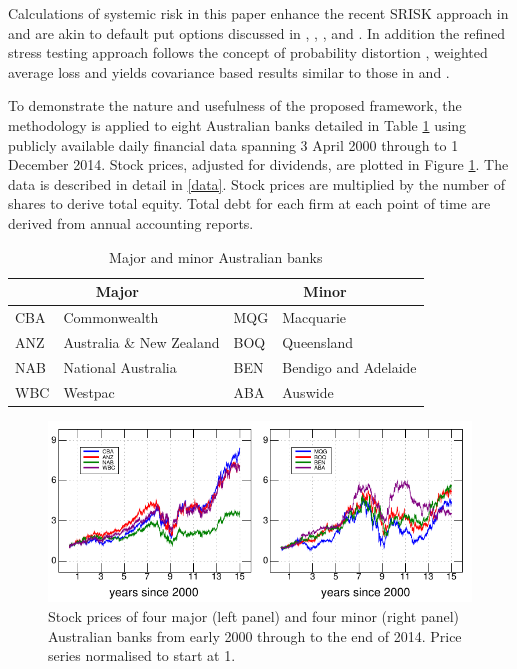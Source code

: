 \documentclass[authoryear]{elsarticle}
\newcommand{\fref}[1]{Figure \ref{#1}}
\newcommand{\tref}[1]{Table \ref{#1}}
\newcommand{\aref}[1]{\ref{#1}}
\begin{document}
Calculations of systemic risk in this paper enhance the recent SRISK approach in \cite{brownlees2015} and are akin to default put options discussed in \citet{merton1977analytic}, \citet{doherty1986price}, \citet{cummins1988risk}, \citet{myers2001capital} and \citet{sherris2006solvency}. In addition the refined stress testing approach follows the concept of probability distortion \citep{wang2000class}, weighted average loss \citep{choo2009loss} and yields covariance based results similar to those in \cite{ruhm2003risk} and \cite{choo2010determining}.


To demonstrate the nature and usefulness of the proposed framework, the methodology is applied to eight Australian banks detailed in \tref{eightbanks} using publicly available daily financial data spanning 3 April 2000 through to 1 December 2014.  Stock prices, adjusted for dividends, are plotted in \fref{prices}.  The data is described in detail in \aref{data}.  Stock prices are multiplied by the number of shares to derive total equity. Total debt for each firm at each point of time are derived from annual accounting reports.

\begin{table}[htbp]
\label{banks}\caption{Major and minor Australian banks}\label{eightbanks}
\begin{center}
\begin{tabular}{l|l||l|l}
\hline
 \multicolumn{2}{c||}{Major}& \multicolumn{2}{c}{Minor}\\
 \hline
CBA & Commonwealth   & MQG  & Macquarie \\
ANZ  & Australia \& New Zealand  & BOQ  &  Queensland\\
NAB  & National Australia  & BEN & Bendigo and Adelaide \\
WBC  & Westpac & ABA & Auswide \\
\hline
\end{tabular}
\end{center}
\end{table}

\begin{figure}[htbp]
\begin{center}
\includegraphics{figures/prices.pdf}
\caption{Stock  prices of four major (left panel) and four minor (right panel) Australian banks from early 2000 through to the end of 2014.  Price series normalised to start at 1.}
\label{prices}
\end{center}
\end{figure}
\end{document}
